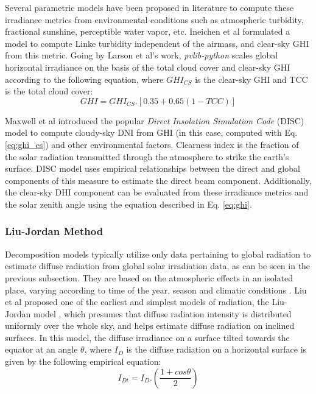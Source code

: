 \par Several parametric models have been proposed in literature to compute these irradiance metrics from environmental conditions such as atmospheric turbidity, fractional sunshine, perceptible water vapor, etc. Ineichen et al \cite{pvlib_ineichen} formulated a model to compute Linke turbidity independent of the airmass, and clear-sky GHI from this metric. Going by Larson et al's \cite{pvlib_larson} work, \textit{pvlib-python} scales global horizontal irradiance on the basis of the total cloud cover and clear-sky GHI according to the following equation, where $GHI_{CS}$ is the clear-sky GHI and TCC is the total cloud cover:
\begin{equation}\label{eq:ghi_cs}
    GHI = GHI_{CS} . [0.35 + 0.65(1 - TCC)]
\end{equation}

\par Maxwell et al \cite{pvlib_disc} introduced the popular \textit{Direct Insolation Simulation Code} (DISC) model to compute cloudy-sky DNI from GHI (in this case, computed with Eq. \ref{eq:ghi_cs}) and other environmental factors. Clearness index is the fraction of the solar radiation transmitted through the atmosphere to strike the earth's surface. DISC model uses empirical relationships between the direct and global components of this measure to estimate the direct beam component. Additionally, the clear-sky DHI component can be evaluated from these irradiance metrics and the solar zenith angle using the equation described in Eq. \ref{eq:ghi}.


\subsubsection*{Liu-Jordan Method}
Decomposition models typically utilize only data pertaining to global radiation to estimate diffuse radiation from global solar irradiation data, as can be seen in the previous subsection. They are based on the atmospheric effects in an isolated place, varying according to time of the year, season and climatic conditions \cite{pvlib_liujordan}. Liu et al proposed one of the earliest and simplest models of radiation, the Liu-Jordan model \cite{pvlib_liujordan2}, which presumes that diffuse radiation intensity is distributed uniformly over the whole sky, and helps estimate diffuse radiation on inclined surfaces. In this model, the diffuse irradiance on a surface tilted towards the equator at an angle $\theta$, where $I_D$ is the diffuse radiation on a horizontal surface is given by the following empirical equation:
\begin{equation}\label{eq:lj_dhi}
    I_{Dt} = I_D . (\frac{1 + cos\theta}{2})
\end{equation}


